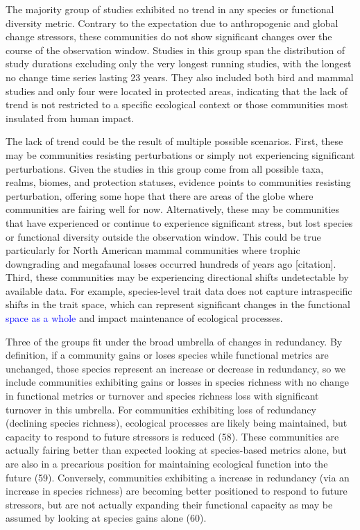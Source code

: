 \documentclass{article}
\begin{document}
The majority group of studies exhibited no trend in any species or
functional diversity metric. Contrary to the expectation due to
anthropogenic and global change stressors, these communities do not show
significant changes over the course of the observation window. Studies
in this group span the distribution of study durations excluding only
the very longest running studies, with the longest no change time series
lasting 23 years. They also included both bird and mammal studies and
only four were located in protected areas, indicating that the lack of
trend is not restricted to a specific ecological context or those
communities most insulated from human impact.

The lack of trend could be the result of multiple possible scenarios.
First, these may be communities resisting perturbations or simply not
experiencing significant perturbations. Given the studies in this group
come from all possible taxa, realms, biomes, and protection statuses,
evidence points to communities resisting perturbation, offering some
hope that there are areas of the globe where communities are fairing
well for now. Alternatively, these may be communities that have
experienced or continue to experience significant stress, but lost
species or functional diversity outside the observation window. This
could be true particularly for North American mammal communities where
trophic downgrading and megafaunal losses occurred hundreds of years ago
{[}citation{]}. Third, these communities may be experiencing directional
shifts undetectable by available data. For example, species-level trait
data does not capture intraspecific shifts in the trait space, which can
represent significant changes in the functional
\textcolor{blue}{space as a whole} and impact maintenance of ecological
processes.

Three of the groups fit under the broad umbrella of changes in
redundancy. By definition, if a community gains or loses species while
functional metrics are unchanged, those species represent an increase or
decrease in redundancy, so we include communities exhibiting gains or
losses in species richness with no change in functional metrics or
turnover and species richness loss with significant turnover in this
umbrella. For communities exhibiting loss of redundancy (declining
species richness), ecological processes are likely being maintained, but
capacity to respond to future stressors is reduced (58). These
communities are actually fairing better than expected looking at
species-based metrics alone, but are also in a precarious position for
maintaining ecological function into the future (59). Conversely,
communities exhibiting a increase in redundancy (via an increase in
species richness) are becoming better positioned to respond to future
stressors, but are not actually expanding their functional capacity as
may be assumed by looking at species gains alone (60).
\end{document}
